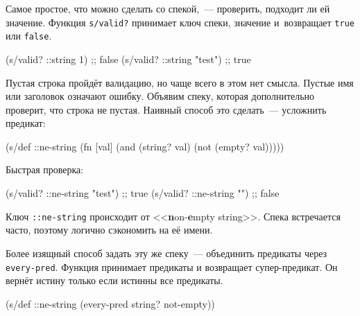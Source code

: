 
Самое простое, что можно сделать со спекой,~--- проверить, подходит ли ей
значение. Функция \verb|s/valid?| принимает ключ спеки, значение и~возвращает
\verb|true| или \verb|false|.

\begin{english}
  \begin{clojure}
(s/valid? ::string 1)      ;; false
(s/valid? ::string "test") ;; true
  \end{clojure}
\end{english}

Пустая строка пройдёт валидацию, но чаще всего в этом нет смысла. Пустые имя или
заголовок означают ошибку. Объявим спеку, которая дополнительно проверит, что
строка не пустая. Наивный способ это сделать~--- усложнить предикат:


\begin{english}
  \begin{clojure}
(s/def ::ne-string
  (fn [val]
    (and (string? val)
         (not (empty? val)))))
  \end{clojure}
\end{english}

\noindent
Быстрая проверка:

\begin{english}
  \begin{clojure}
(s/valid? ::ne-string "test") ;; true
(s/valid? ::ne-string "")     ;; false
  \end{clojure}
\end{english}

\label{ne-string}

Ключ \verb|::ne-string| происходит от <<\textbf{n}on-\textbf{e}mpty
string>>. Спека встречается часто, поэтому логично сэкономить на её имени.

Более изящный способ задать эту же спеку~--- объединить предикаты через
\verb|every-pred|. Функция принимает предикаты и возвращает супер-предикат. Он
вернёт истину только если истинны все предикаты.

\begin{english}
  \begin{clojure}
(s/def ::ne-string
  (every-pred string? not-empty))
  \end{clojure}
\end{english}


